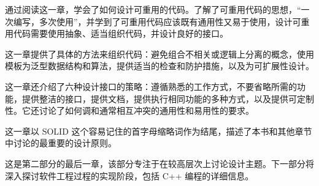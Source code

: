 通过阅读这一章，学会了如何设计可重用的代码。了解了可重用代码的思想，“一次编写，多次使用”，并学到了可重用代码应该既有通用性又易于使用，设计可重用代码需要使用抽象、适当组织代码，并设计良好的接口。

这一章提供了具体的方法来组织代码：避免组合不相关或逻辑上分离的概念，使用模板为泛型数据结构和算法，提供适当的检查和防护措施，以及为可扩展性设计。

这一章还介绍了六种设计接口的策略：遵循熟悉的工作方式，不要省略所需的功能，提供整洁的接口，提供文档，提供执行相同功能的多种方式，以及提供可定制性。它还讨论了如何调和通常相互冲突的通用性和易用性的要求。

这一章以 SOLID 这个容易记住的首字母缩略词作为结尾，描述了本书和其他章节中讨论的最重要的设计原则。

这是第二部分的最后一章，该部分专注于在较高层次上讨论设计主题。下一部分将深入探讨软件工程过程的实现阶段，包括 C++ 编程的详细信息。